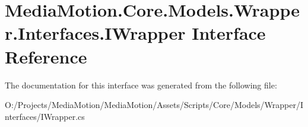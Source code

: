\hypertarget{interface_media_motion_1_1_core_1_1_models_1_1_wrapper_1_1_interfaces_1_1_i_wrapper}{\section{Media\+Motion.\+Core.\+Models.\+Wrapper.\+Interfaces.\+I\+Wrapper Interface Reference}
\label{interface_media_motion_1_1_core_1_1_models_1_1_wrapper_1_1_interfaces_1_1_i_wrapper}
}


The documentation for this interface was generated from the following file\+:\begin{DoxyCompactItemize}
\item 
O\+:/\+Projects/\+Media\+Motion/\+Media\+Motion/\+Assets/\+Scripts/\+Core/\+Models/\+Wrapper/\+Interfaces/I\+Wrapper.\+cs\end{DoxyCompactItemize}
